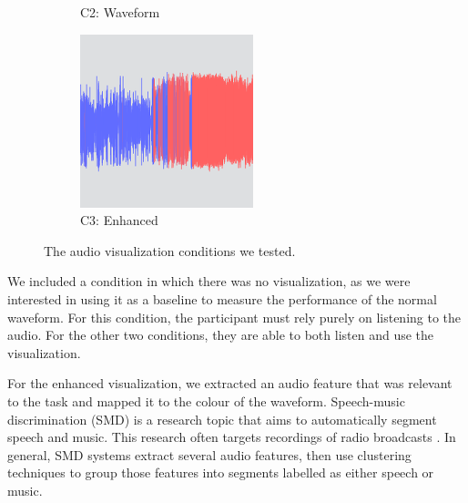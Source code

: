 \begin{figure}[ht]
\begin{subfigure}{.3\textwidth}
    \caption{C2: Waveform}
  \end{subfigure}
  \begin{subfigure}{.3\textwidth}
    \centering
    \includegraphics[width=\columnwidth]{figs/condition3.png}
    \caption{C3: Enhanced}
  \end{subfigure}
  \caption{The audio visualization conditions we tested.}
  \label{fig:conditions}
\end{figure}

We included a condition in which there was no visualization, as we were interested in using it as a baseline to measure
the performance of the normal waveform. For this condition, the participant must rely purely on listening to the audio.
For the other two conditions, they are able to both listen and use the visualization.

For the enhanced visualization, we extracted an audio feature that was relevant to the task and mapped it to the colour
of the waveform.
Speech-music discrimination (SMD) is a research topic that aims to automatically segment speech and music.  This
research often targets recordings of radio broadcasts
\citep{Goodwin2004,Wieser2014,Saunders1996,Pikrakis2008,Pikrakis2006a}. In general, SMD systems extract several audio
features, then use clustering techniques to group those features into segments labelled as either speech or music.

